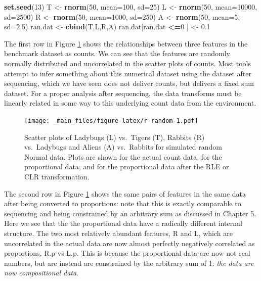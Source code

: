 \documentclass[onecolumn]{article}
\newenvironment{Shaded}{\begin{snugshade}}{\end{snugshade}}
\newcommand{\DataTypeTok}[1]{\textcolor[rgb]{0.13,0.29,0.53}{#1}}
\newcommand{\DecValTok}[1]{\textcolor[rgb]{0.00,0.00,0.81}{#1}}
\newcommand{\FloatTok}[1]{\textcolor[rgb]{0.00,0.00,0.81}{#1}}
\newcommand{\KeywordTok}[1]{\textcolor[rgb]{0.13,0.29,0.53}{\textbf{#1}}}
\newcommand{\NormalTok}[1]{#1}
\newcommand{\OperatorTok}[1]{\textcolor[rgb]{0.81,0.36,0.00}{\textbf{#1}}}
\newcommand{\StringTok}[1]{\textcolor[rgb]{0.31,0.60,0.02}{#1}}
\begin{document}
\begin{Shaded}
\begin{Highlighting}[]
\KeywordTok{set.seed}\NormalTok{(}\DecValTok{13}\NormalTok{)}
\NormalTok{T <-}\StringTok{ }\KeywordTok{rnorm}\NormalTok{(}\DecValTok{50}\NormalTok{, }\DataTypeTok{mean=}\DecValTok{100}\NormalTok{, }\DataTypeTok{sd=}\DecValTok{25}\NormalTok{)}
\NormalTok{L <-}\StringTok{ }\KeywordTok{rnorm}\NormalTok{(}\DecValTok{50}\NormalTok{, }\DataTypeTok{mean=}\DecValTok{10000}\NormalTok{, }\DataTypeTok{sd=}\DecValTok{2500}\NormalTok{)}
\NormalTok{R <-}\StringTok{ }\KeywordTok{rnorm}\NormalTok{(}\DecValTok{50}\NormalTok{, }\DataTypeTok{mean=}\DecValTok{1000}\NormalTok{, }\DataTypeTok{sd=}\DecValTok{250}\NormalTok{)}
\NormalTok{A <-}\StringTok{ }\KeywordTok{rnorm}\NormalTok{(}\DecValTok{50}\NormalTok{, }\DataTypeTok{mean=}\DecValTok{5}\NormalTok{, }\DataTypeTok{sd=}\FloatTok{2.5}\NormalTok{)}
\NormalTok{ran.dat <-}\StringTok{ }\KeywordTok{cbind}\NormalTok{(T,L,R,A)}
\NormalTok{ran.dat[ran.dat }\OperatorTok{<=}\DecValTok{0}\NormalTok{ ] <-}\StringTok{ }\FloatTok{0.1}
\end{Highlighting}
\end{Shaded}

The first row in Figure \ref{fig:r-random} shows the relationships between three features in the benchmark dataset as counts. We can see that the features are randomly normally distributed and uncorrelated in the scatter plots of counts. Most tools attempt to infer something about this numerical dataset using the dataset after sequencing, which we have seen does not deliver counts, but delivers a fixed sum dataset. For a proper analysis after sequencing, the data transforms must be linearly related in some way to this underlying count data from the environment.

\begin{figure}
\centering
\texttt{[image: \_main\_files/figure-latex/r-random-1.pdf]}
\caption{\label{fig:r-random}Scatter plots of Ladybugs (L) vs.~Tigers (T), Rabbits (R) vs.~Ladybugs and Aliens (A) vs.~Rabbits for simulated random Normal data. Plots are shown for the actual count data, for the proportional data, and for the proportional data after the RLE or CLR transformation.}
\end{figure}

The second row in Figure \ref{fig:r-random} shows the same pairs of features in the same data after being converted to proportions: note that this is exactly comparable to sequencing and being constrained by an arbitrary sum as discussed in Chapter 5. Here we see that the the proportional data have a radically different internal structure. The two most relatively abundant features, R and L, which are uncorrelated in the actual data are now almost perfectly negatively correlated as proportions, R.p vs L.p. This is because the proportional data are now not real numbers, but are instead are constrained by the arbitrary sum of 1: \emph{the data are now compositional data}.
\end{document}
